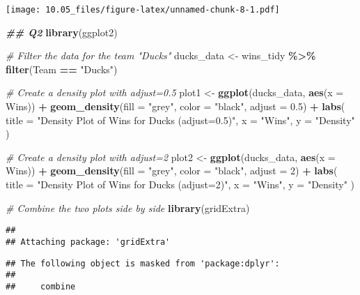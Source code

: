 \documentclass[
]{article}
\newenvironment{Shaded}{\begin{snugshade}}{\end{snugshade}}
\newcommand{\AttributeTok}[1]{\textcolor[rgb]{0.13,0.29,0.53}{#1}}
\newcommand{\CommentTok}[1]{\textcolor[rgb]{0.56,0.35,0.01}{\textit{#1}}}
\newcommand{\DecValTok}[1]{\textcolor[rgb]{0.00,0.00,0.81}{#1}}
\newcommand{\DocumentationTok}[1]{\textcolor[rgb]{0.56,0.35,0.01}{\textbf{\textit{#1}}}}
\newcommand{\FloatTok}[1]{\textcolor[rgb]{0.00,0.00,0.81}{#1}}
\newcommand{\FunctionTok}[1]{\textcolor[rgb]{0.13,0.29,0.53}{\textbf{#1}}}
\newcommand{\NormalTok}[1]{#1}
\newcommand{\OtherTok}[1]{\textcolor[rgb]{0.56,0.35,0.01}{#1}}
\newcommand{\SpecialCharTok}[1]{\textcolor[rgb]{0.81,0.36,0.00}{\textbf{#1}}}
\newcommand{\StringTok}[1]{\textcolor[rgb]{0.31,0.60,0.02}{#1}}
\begin{document}
\texttt{[image: 10.05\_files/figure-latex/unnamed-chunk-8-1.pdf]}

\begin{Shaded}
\begin{Highlighting}[]
\DocumentationTok{\#\# Q2}
\FunctionTok{library}\NormalTok{(ggplot2)}

\CommentTok{\# Filter the data for the team "Ducks"}
\NormalTok{ducks\_data }\OtherTok{\textless{}{-}}\NormalTok{ wins\_tidy }\SpecialCharTok{\%\textgreater{}\%}
    \FunctionTok{filter}\NormalTok{(Team }\SpecialCharTok{==} \StringTok{"Ducks"}\NormalTok{)}

\CommentTok{\# Create a density plot with adjust=0.5}
\NormalTok{plot1 }\OtherTok{\textless{}{-}} \FunctionTok{ggplot}\NormalTok{(ducks\_data, }\FunctionTok{aes}\NormalTok{(}\AttributeTok{x =}\NormalTok{ Wins)) }\SpecialCharTok{+}
    \FunctionTok{geom\_density}\NormalTok{(}\AttributeTok{fill =} \StringTok{"grey"}\NormalTok{, }\AttributeTok{color =} \StringTok{"black"}\NormalTok{, }\AttributeTok{adjust =} \FloatTok{0.5}\NormalTok{) }\SpecialCharTok{+}
    \FunctionTok{labs}\NormalTok{(}
        \AttributeTok{title =} \StringTok{"Density Plot of Wins for Ducks (adjust=0.5)"}\NormalTok{,}
        \AttributeTok{x =} \StringTok{"Wins"}\NormalTok{,}
        \AttributeTok{y =} \StringTok{"Density"}
\NormalTok{    )}

\CommentTok{\# Create a density plot with adjust=2}
\NormalTok{plot2 }\OtherTok{\textless{}{-}} \FunctionTok{ggplot}\NormalTok{(ducks\_data, }\FunctionTok{aes}\NormalTok{(}\AttributeTok{x =}\NormalTok{ Wins)) }\SpecialCharTok{+}
    \FunctionTok{geom\_density}\NormalTok{(}\AttributeTok{fill =} \StringTok{"grey"}\NormalTok{, }\AttributeTok{color =} \StringTok{"black"}\NormalTok{, }\AttributeTok{adjust =} \DecValTok{2}\NormalTok{) }\SpecialCharTok{+}
    \FunctionTok{labs}\NormalTok{(}
        \AttributeTok{title =} \StringTok{"Density Plot of Wins for Ducks (adjust=2)"}\NormalTok{,}
        \AttributeTok{x =} \StringTok{"Wins"}\NormalTok{,}
        \AttributeTok{y =} \StringTok{"Density"}
\NormalTok{    )}

\CommentTok{\# Combine the two plots side by side}
\FunctionTok{library}\NormalTok{(gridExtra)}
\end{Highlighting}
\end{Shaded}

\begin{verbatim}
## 
## Attaching package: 'gridExtra'
\end{verbatim}

\begin{verbatim}
## The following object is masked from 'package:dplyr':
## 
##     combine
\end{verbatim}
\end{document}
